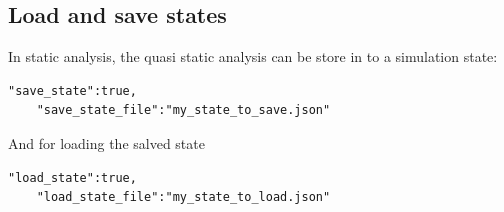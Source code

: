 \subsection{Load and save states}

In static analysis, the quasi static analysis can be store in to a simulation state:

\begin{lstlisting}[language={},caption={input JSON}]
	"save_state":true,
	"save_state_file":"my_state_to_save.json"
\end{lstlisting}

And for loading the salved state

\begin{lstlisting}[language={},caption={input JSON}]
	"load_state":true,
	"load_state_file":"my_state_to_load.json"
\end{lstlisting}